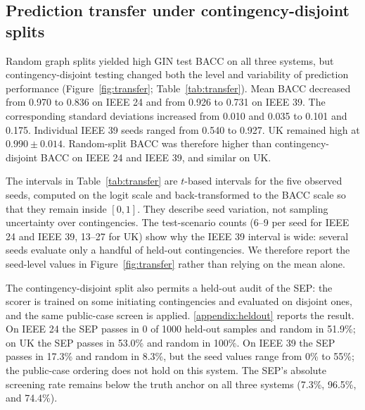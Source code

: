 \subsection{Prediction transfer under contingency-disjoint splits}\label{contingency_disjoint_evaluation_exposes_system_dependent_prediction_transfer}

Random graph splits yielded high GIN test BACC on all three systems, but contingency-disjoint testing changed both the level and variability of prediction performance (Figure~\ref{fig:transfer}; Table~\ref{tab:transfer}). Mean BACC decreased from 0.970 to 0.836 on IEEE 24 and from 0.926 to 0.731 on IEEE 39. The corresponding standard deviations increased from 0.010 and 0.035 to 0.101 and 0.175. Individual IEEE 39 seeds ranged from 0.540 to 0.927. UK remained high at $0.990\pm0.014$. Random-split BACC was therefore higher than contingency-disjoint BACC on IEEE 24 and IEEE 39, and similar on UK.

The intervals in Table~\ref{tab:transfer} are $t$-based intervals for the five observed seeds, computed on the logit scale and back-transformed to the BACC scale so that they remain inside $[0,1]$. They describe seed variation, not sampling uncertainty over contingencies. The test-scenario counts (6--9 per seed for IEEE 24 and IEEE 39, 13--27 for UK) show why the IEEE 39 interval is wide: several seeds evaluate only a handful of held-out contingencies. We therefore report the seed-level values in Figure~\ref{fig:transfer} rather than relying on the mean alone.

The contingency-disjoint split also permits a held-out audit of the SEP: the scorer is trained on some initiating contingencies and evaluated on disjoint ones, and the same public-case screen is applied. \ref{appendix:heldout} reports the result. On IEEE 24 the SEP passes in 0 of 1000 held-out samples and random in 51.9\%; on UK the SEP passes in 53.0\% and random in 100\%. On IEEE 39 the SEP passes in 17.3\% and random in 8.3\%, but the seed values range from 0\% to 55\%; the public-case ordering does not hold on this system. The SEP's absolute screening rate remains below the truth anchor on all three systems (7.3\%, 96.5\%, and 74.4\%).


